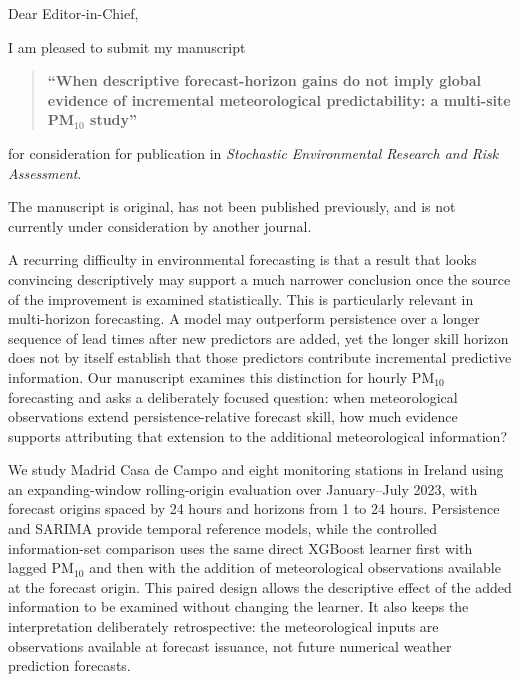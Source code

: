\documentclass[9pt,a4paper]{article}
\begin{document}
\small

\noindent
Dear Editor-in-Chief,

I am pleased to submit my manuscript

\begin{quote}
\textbf{``When descriptive forecast-horizon gains do not imply global evidence
of incremental meteorological predictability: a multi-site PM$_{10}$ study''}
\end{quote}

for consideration for publication in
\textit{Stochastic Environmental Research and Risk Assessment}.

The manuscript is original, has not been published previously, and is not
currently under consideration by another journal.

A recurring difficulty in environmental forecasting is that a result that
looks convincing descriptively may support a much narrower conclusion once
the source of the improvement is examined statistically. This is particularly
relevant in multi-horizon forecasting. A model may outperform persistence over
a longer sequence of lead times after new predictors are added, yet the longer
skill horizon does not by itself establish that those predictors contribute
incremental predictive information. Our manuscript examines this distinction
for hourly PM$_{10}$ forecasting and asks a deliberately focused question:
when meteorological observations extend persistence-relative forecast skill,
how much evidence supports attributing that extension to the additional
meteorological information?

We study Madrid Casa de Campo and eight monitoring stations in Ireland using
an expanding-window rolling-origin evaluation over January--July 2023, with
forecast origins spaced by 24 hours and horizons from 1 to 24 hours. Persistence
and SARIMA provide temporal reference models, while the controlled
information-set comparison uses the same direct XGBoost learner first with
lagged PM$_{10}$ and then with the addition of meteorological observations
available at the forecast origin. This paired design allows the descriptive
effect of the added information to be examined without changing the learner.
It also keeps the interpretation deliberately retrospective: the
meteorological inputs are observations available at forecast issuance, not
future numerical weather prediction forecasts.
\end{document}
